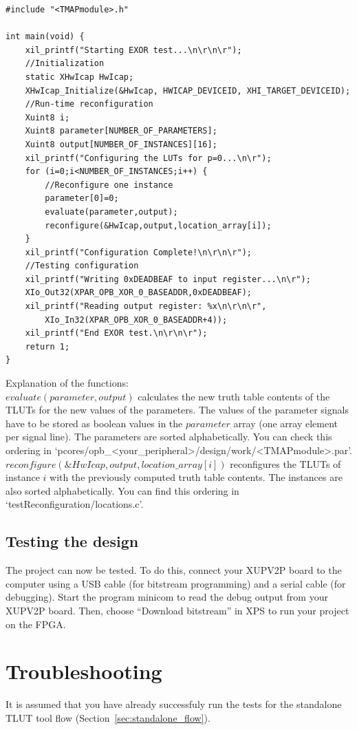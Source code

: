 \documentclass[a4paper,oneside]{memoir}
\begin{document}
\lstset{language=[ansi]C,showstringspaces=false}
\begin{lstlisting}
#include "<TMAPmodule>.h"

int main(void) {
	xil_printf("Starting EXOR test...\n\r\n\r");
	//Initialization
	static XHwIcap HwIcap;
	XHwIcap_Initialize(&HwIcap, HWICAP_DEVICEID, XHI_TARGET_DEVICEID);
	//Run-time reconfiguration
	Xuint8 i;
	Xuint8 parameter[NUMBER_OF_PARAMETERS];
	Xuint8 output[NUMBER_OF_INSTANCES][16];
	xil_printf("Configuring the LUTs for p=0...\n\r");
	for (i=0;i<NUMBER_OF_INSTANCES;i++) {
		//Reconfigure one instance
		parameter[0]=0;
		evaluate(parameter,output);
		reconfigure(&HwIcap,output,location_array[i]);
	}
	xil_printf("Configuration Complete!\n\r\n\r");
	//Testing configuration
	xil_printf("Writing 0xDEADBEAF to input register...\n\r");
	XIo_Out32(XPAR_OPB_XOR_0_BASEADDR,0xDEADBEAF);
	xil_printf("Reading output register: %x\n\r\n\r", 
		XIo_In32(XPAR_OPB_XOR_0_BASEADDR+4));
	xil_printf("End EXOR test.\n\r\n\r");
	return 1;
}
\end{lstlisting}

Explanation of the functions:\\
$evaluate(parameter, output)$ calculates the new truth table contents of the TLUTs for the new values of the parameters. The  values of the parameter signals have to be stored as boolean values in the $parameter$ array (one array element per signal line). The parameters are sorted alphabetically. You can check this ordering in `pcores/opb\_<your\_peripheral>/design/work/<TMAPmodule>.par'.\\
$reconfigure(\&HwIcap, output, location\_array[i])$ reconfigures the TLUTs of instance $i$ with the previously computed truth table contents. The instances are also sorted alphabetically. You can find this ordering in `testReconfiguration/locations.c'.


\subsection{Testing the design}\label{sec:testing}
The project can now be tested. To do this, connect your XUPV2P board to the computer using a USB cable (for bitstream programming) and a serial cable (for debugging). Start the program minicom to read the debug output from your XUPV2P board. Then, choose ``Download bitstream'' in XPS to run your project on the FPGA.


\section{Troubleshooting}\label{sec:xilinx_troubleshooting}
It is assumed that you have already successfuly run the tests for the standalone TLUT tool flow (Section~\ref{sec:standalone_flow}).
\end{document}
